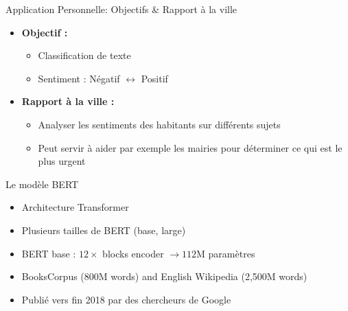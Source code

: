 \documentclass[12pt]{beamer}
\begin{document}

\begin{frame}{Application Personnelle: Objectifs \& Rapport à la ville}


\begin{itemize}
	\item \textbf{Objectif :}
	\begin{itemize}
		\item Classification de texte
		\item Sentiment : Négatif $\longleftrightarrow$ Positif
	\end{itemize}
	\item \textbf{Rapport à la ville :}
	\begin{itemize}
		\item Analyser les sentiments des habitants sur différents sujets
		\item Peut servir à aider par exemple les mairies pour déterminer ce qui est le plus urgent
	\end{itemize}
\end{itemize}


\end{frame}



\begin{frame}{Le modèle BERT}

\begin{itemize}
	\item Architecture Transformer
	\item Plusieurs tailles de BERT (base, large)
	\item BERT base : $12 \times$ blocks encoder $\to 112$M paramètres 
	\item BooksCorpus (800M words) and English Wikipedia (2,500M words)
	\item Publié vers fin 2018 par des chercheurs de Google
\end{itemize}

\end{frame}


\end{document}
